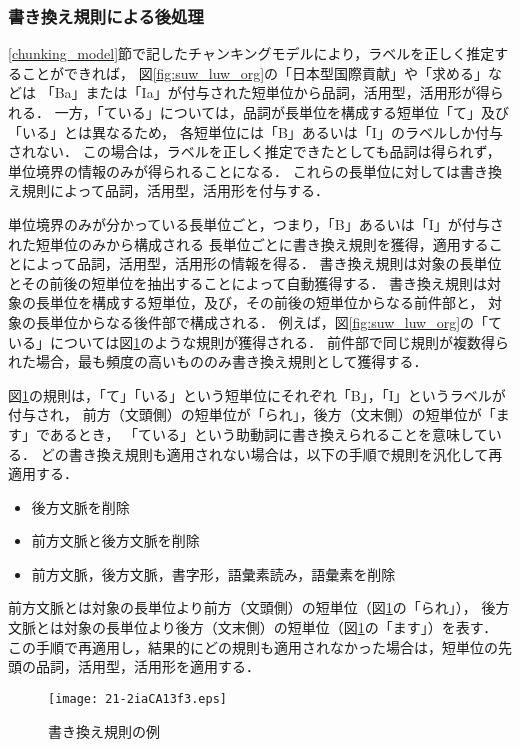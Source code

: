 \documentclass[japanese]{jnlp_1.4}
\begin{document}
\subsubsection{書き換え規則による後処理}
\label{post_process_org}

\ref{chunking_model}節で記したチャンキングモデルにより，ラベルを正しく推定することができれば，
図\ref{fig:suw_luw_org}の「日本型国際貢献」や「求める」などは
「Ba」または「Ia」が付与された短単位から品詞，活用型，活用形が得られる．
一方，「ている」については，品詞が長単位を構成する短単位「て」及び「いる」とは異なるため，
各短単位には「B」あるいは「I」のラベルしか付与されない．
この場合は，ラベルを正しく推定できたとしても品詞は得られず，単位境界の情報のみが得られることになる．
これらの長単位に対しては書き換え規則によって品詞，活用型，活用形を付与する．

単位境界のみが分かっている長単位ごと，つまり，「B」あるいは「I」が付与された短単位のみから構成される
長単位ごとに書き換え規則を獲得，適用することによって品詞，活用型，活用形の情報を得る．
書き換え規則は対象の長単位とその前後の短単位を抽出することによって自動獲得する．
書き換え規則は対象の長単位を構成する短単位，及び，その前後の短単位からなる前件部と，
対象の長単位からなる後件部で構成される．
例えば，図\ref{fig:suw_luw_org}の「ている」については図\ref{fig:rule}のような規則が獲得される．
前件部で同じ規則が複数得られた場合，最も頻度の高いもののみ書き換え規則として獲得する．

図\ref{fig:rule}の規則は，「て」「いる」という短単位にそれぞれ「B」，「I」というラベルが付与され，
前方（文頭側）の短単位が「られ」，後方（文末側）の短単位が「ます」であるとき，
「ている」という助動詞に書き換えられることを意味している．
どの書き換え規則も適用されない場合は，以下の手順で規則を汎化して再適用する．
\begin{itemize}
\item 後方文脈を削除
\item 前方文脈と後方文脈を削除
\item 前方文脈，後方文脈，書字形，語彙素読み，語彙素を削除
\end{itemize}
前方文脈とは対象の長単位より前方（文頭側）の短単位（図\ref{fig:rule}の「られ」），
後方文脈とは対象の長単位より後方（文末側）の短単位（図\ref{fig:rule}の「ます」）を表す．
この手順で再適用し，結果的にどの規則も適用されなかった場合は，短単位の先頭の品詞，活用型，活用形を適用する．

\begin{figure}[t]
\begin{center}
\texttt{[image: 21-2iaCA13f3.eps]}
\end{center}
\caption{書き換え規則の例}
\label{fig:rule}
\end{figure}
\end{document}
